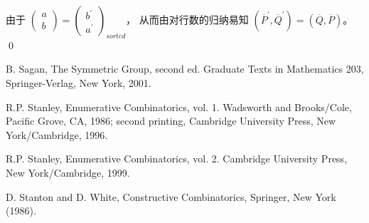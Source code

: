 由于 $\left(\begin{array}{c}
a\\b\end{array}\right)=\left(\begin{array}{c}
b^{'}\\a^{'}\end{array}\right)_{sorted}$， 从而由对行数的归纳易知
$({\overline{P}}^{'}, \overline{Q}^{'})=(\overline{Q},
\overline{P})$。 \qed





% 
\begin{thebibliography}{99}



B. Sagan, The Symmetric Group, second ed. Graduate Texts in
Mathematics 203, Springer-Verlag, New York, 2001.


R.P. Stanley, Enumerative Combinatorics, vol. 1. Wadsworth and
Brooks/Cole, Pacific Grove, CA, 1986; second printing, Cambridge
University Press, New York/Cambridge, 1996.

R.P. Stanley, Enumerative Combinatorics, vol. 2. Cambridge
University Press, New York/Cambridge, 1999.

D. Stanton and D. White, Constructive Combinatorics, Springer, New York (1986).


\end{thebibliography}
